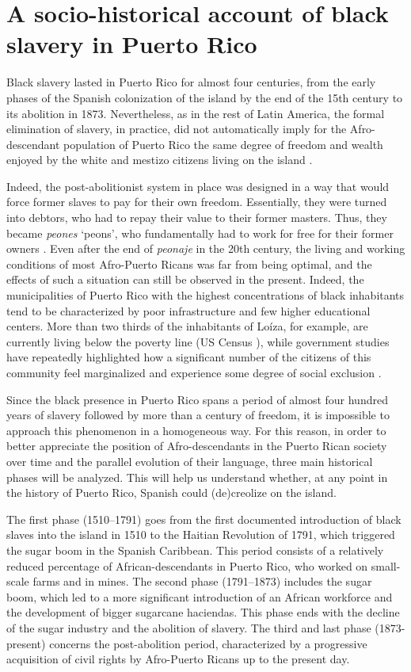 \documentclass[output=paper,colorlinks,citecolor=brown]{langscibook}
\begin{document}
\section{A socio-historical account of black slavery in Puerto Rico} \label{sec:visconti:4}

Black slavery lasted in Puerto Rico for almost four centuries, from the early phases of the Spanish colonization of the island by the end of the 15th century to its abolition in 1873. Nevertheless, as in the rest of Latin America, the formal elimination of slavery, in practice, did not automatically imply for the Afro-descendant population of Puerto Rico the same degree of freedom and wealth enjoyed by the white and mestizo citizens living on the island \citep{Bas-García2009}. 

Indeed, the post-abolitionist system in place was designed in a way that would force former slaves to pay for their own freedom. Essentially, they were turned into debtors, who had to repay their value to their former masters. Thus, they became \textit{peones} ‘peons’, who fundamentally had to work for free for their former owners \citep{Bas-García2009}. Even after the end of \textit{peonaje} in the 20th century, the living and working conditions of most Afro-Puerto Ricans was far from being optimal, and the effects of such a situation can still be observed in the present. Indeed, the municipalities of Puerto Rico with the highest concentrations of black inhabitants tend to be characterized by poor infrastructure and few higher educational centers. More than two thirds of the inhabitants of Loíza, for example, are currently living below the poverty line (US Census \citeyear{UScensus2010}), while government studies have repeatedly highlighted how a significant number of the citizens of this community feel marginalized and experience some degree of social exclusion \citep{Rivera-Quintero2014}.

Since the black presence in Puerto Rico spans a period of almost four hundred years of slavery followed by more than a century of freedom, it is impossible to approach this phenomenon in a homogeneous way. For this reason, in order to better appreciate the position of Afro-descendants in the Puerto Rican society over time and the parallel evolution of their language, three main historical phases will be analyzed. This will help us understand whether, at any point in the history of Puerto Rico, Spanish could (de)creolize on the island. 

The first phase (1510--1791) goes from the first documented introduction of black slaves into the island in 1510 to the Haitian Revolution of 1791, which triggered the sugar boom in the Spanish Caribbean. This period consists of a relatively reduced percentage of African-descendants in Puerto Rico, who worked on small-scale farms and in mines. The second phase (1791--1873) includes the sugar boom, which led to a more significant introduction of an African workforce and the development of bigger sugarcane haciendas. This phase ends with the decline of the sugar industry and the abolition of slavery. The third and last phase (1873-present) concerns the post-abolition period, characterized by a progressive acquisition of civil rights by Afro-Puerto Ricans up to the present day.
\end{document}

